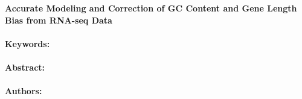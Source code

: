 \noindent
\large {\bf Accurate Modeling and Correction of GC Content and Gene Length Bias from RNA-seq Data} 


\normalsize 


\noindent \paragraph{Keywords:} 

\noindent \paragraph{Abstract:} 



\noindent \paragraph{Authors:} 

